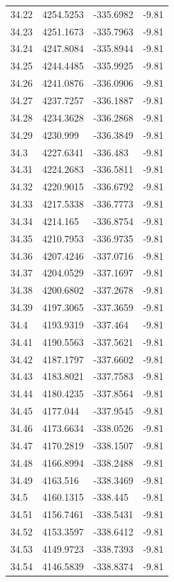 \begin{table}[H]
\begin{tabular}{llll}
34.22 & 4254.5253 & -335.6982 & -9.81 \\
34.23 & 4251.1673 & -335.7963 & -9.81 \\
34.24 & 4247.8084 & -335.8944 & -9.81 \\
34.25 & 4244.4485 & -335.9925 & -9.81 \\
34.26 & 4241.0876 & -336.0906 & -9.81 \\
34.27 & 4237.7257 & -336.1887 & -9.81 \\
34.28 & 4234.3628 & -336.2868 & -9.81 \\
34.29 & 4230.999 & -336.3849 & -9.81 \\
34.3 & 4227.6341 & -336.483 & -9.81 \\
34.31 & 4224.2683 & -336.5811 & -9.81 \\
34.32 & 4220.9015 & -336.6792 & -9.81 \\
34.33 & 4217.5338 & -336.7773 & -9.81 \\
34.34 & 4214.165 & -336.8754 & -9.81 \\
34.35 & 4210.7953 & -336.9735 & -9.81 \\
34.36 & 4207.4246 & -337.0716 & -9.81 \\
34.37 & 4204.0529 & -337.1697 & -9.81 \\
34.38 & 4200.6802 & -337.2678 & -9.81 \\
34.39 & 4197.3065 & -337.3659 & -9.81 \\
34.4 & 4193.9319 & -337.464 & -9.81 \\
34.41 & 4190.5563 & -337.5621 & -9.81 \\
34.42 & 4187.1797 & -337.6602 & -9.81 \\
34.43 & 4183.8021 & -337.7583 & -9.81 \\
34.44 & 4180.4235 & -337.8564 & -9.81 \\
34.45 & 4177.044 & -337.9545 & -9.81 \\
34.46 & 4173.6634 & -338.0526 & -9.81 \\
34.47 & 4170.2819 & -338.1507 & -9.81 \\
34.48 & 4166.8994 & -338.2488 & -9.81 \\
34.49 & 4163.516 & -338.3469 & -9.81 \\
34.5 & 4160.1315 & -338.445 & -9.81 \\
34.51 & 4156.7461 & -338.5431 & -9.81 \\
34.52 & 4153.3597 & -338.6412 & -9.81 \\
34.53 & 4149.9723 & -338.7393 & -9.81 \\
34.54 & 4146.5839 & -338.8374 & -9.81 \\

\end{tabular}
\end{table}
